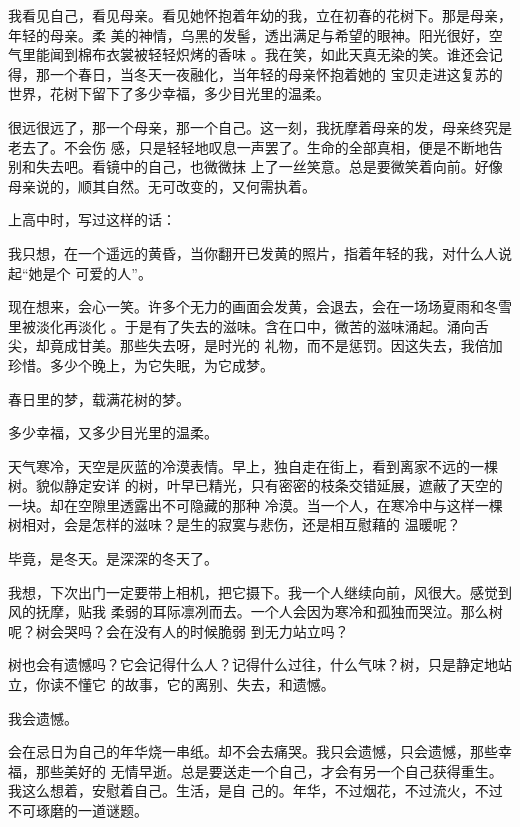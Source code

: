 \documentclass[12pt,a4paper]{article}
\begin{document}
		我看见自己，看见母亲。看见她怀抱着年幼的我，立在初春的花树下。那是母亲，年轻的母亲。柔
	美的神情，乌黑的发髻，透出满足与希望的眼神。阳光很好，空气里能闻到棉布衣裳被轻轻炽烤的香味
	。我在笑，如此天真无染的笑。谁还会记得，那一个春日，当冬天一夜融化，当年轻的母亲怀抱着她的
	宝贝走进这复苏的世界，花树下留下了多少幸福，多少目光里的温柔。

		很远很远了，那一个母亲，那一个自己。这一刻，我抚摩着母亲的发，母亲终究是老去了。不会伤
	感，只是轻轻地叹息一声罢了。生命的全部真相，便是不断地告别和失去吧。看镜中的自己，也微微抹
	上了一丝笑意。总是要微笑着向前。好像母亲说的，顺其自然。无可改变的，又何需执着。

		上高中时，写过这样的话：

		\longpoem{}{}{} \setlength\parindent{2\ccwd}
			我只想，在一个遥远的黄昏，当你翻开已发黄的照片，指着年轻的我，对什么人说起“她是个
		可爱的人”。
		\endlongpoem

		现在想来，会心一笑。许多个无力的画面会发黄，会退去，会在一场场夏雨和冬雪里被淡化再淡化
	。于是有了失去的滋味。含在口中，微苦的滋味涌起。涌向舌尖，却竟成甘美。那些失去呀，是时光的
	礼物，而不是惩罚。因这失去，我倍加珍惜。多少个晚上，为它失眠，为它成梦。

		春日里的梦，载满花树的梦。

		多少幸福，又多少目光里的温柔。

	\endwriting



		天气寒冷，天空是灰蓝的冷漠表情。早上，独自走在街上，看到离家不远的一棵树。貌似静定安详
	的树，叶早已精光，只有密密的枝条交错延展，遮蔽了天空的一块。却在空隙里透露出不可隐藏的那种
	冷漠。当一个人，在寒冷中与这样一棵树相对，会是怎样的滋味？是生的寂寞与悲伤，还是相互慰藉的
	温暖呢？

		毕竟，是冬天。是深深的冬天了。

		我想，下次出门一定要带上相机，把它摄下。我一个人继续向前，风很大。感觉到风的抚摩，贴我
	柔弱的耳际凛冽而去。一个人会因为寒冷和孤独而哭泣。那么树呢？树会哭吗？会在没有人的时候脆弱
	到无力站立吗？

		树也会有遗憾吗？它会记得什么人？记得什么过往，什么气味？树，只是静定地站立，你读不懂它
	的故事，它的离别、失去，和遗憾。

		我会遗憾。

		会在忌日为自己的年华烧一串纸。却不会去痛哭。我只会遗憾，只会遗憾，那些幸福，那些美好的
	无情早逝。总是要送走一个自己，才会有另一个自己获得重生。我这么想着，安慰着自己。生活，是自
	己的。年华，不过烟花，不过流火，不过不可琢磨的一道谜题。
\end{document}

